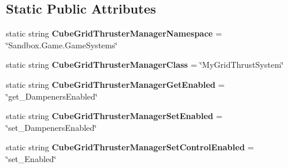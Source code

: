 \subsection*{Static Public Attributes}
\begin{DoxyCompactItemize}
\item 
\hypertarget{class_s_e_mod_a_p_i_internal_1_1_a_p_i_1_1_entity_1_1_sector_1_1_sector_object_1_1_cube_grid_thruster_manager_acc9e664b083af30d3189ae2f69c47e2f}{}static string {\bfseries Cube\+Grid\+Thruster\+Manager\+Namespace} = \char`\"{}Sandbox.\+Game.\+Game\+Systems\char`\"{}\label{class_s_e_mod_a_p_i_internal_1_1_a_p_i_1_1_entity_1_1_sector_1_1_sector_object_1_1_cube_grid_thruster_manager_acc9e664b083af30d3189ae2f69c47e2f}

\item 
\hypertarget{class_s_e_mod_a_p_i_internal_1_1_a_p_i_1_1_entity_1_1_sector_1_1_sector_object_1_1_cube_grid_thruster_manager_aabb329315ec131e37fdb0672e01287df}{}static string {\bfseries Cube\+Grid\+Thruster\+Manager\+Class} = \char`\"{}My\+Grid\+Thrust\+System\char`\"{}\label{class_s_e_mod_a_p_i_internal_1_1_a_p_i_1_1_entity_1_1_sector_1_1_sector_object_1_1_cube_grid_thruster_manager_aabb329315ec131e37fdb0672e01287df}

\item 
\hypertarget{class_s_e_mod_a_p_i_internal_1_1_a_p_i_1_1_entity_1_1_sector_1_1_sector_object_1_1_cube_grid_thruster_manager_ac6b44fe7955c6a6b18332a34139384ed}{}static string {\bfseries Cube\+Grid\+Thruster\+Manager\+Get\+Enabled} = \char`\"{}get\+\_\+\+Dampeners\+Enabled\char`\"{}\label{class_s_e_mod_a_p_i_internal_1_1_a_p_i_1_1_entity_1_1_sector_1_1_sector_object_1_1_cube_grid_thruster_manager_ac6b44fe7955c6a6b18332a34139384ed}

\item 
\hypertarget{class_s_e_mod_a_p_i_internal_1_1_a_p_i_1_1_entity_1_1_sector_1_1_sector_object_1_1_cube_grid_thruster_manager_a8e9408afea4fc11cb5d031cef5a038f7}{}static string {\bfseries Cube\+Grid\+Thruster\+Manager\+Set\+Enabled} = \char`\"{}set\+\_\+\+Dampeners\+Enabled\char`\"{}\label{class_s_e_mod_a_p_i_internal_1_1_a_p_i_1_1_entity_1_1_sector_1_1_sector_object_1_1_cube_grid_thruster_manager_a8e9408afea4fc11cb5d031cef5a038f7}

\item 
\hypertarget{class_s_e_mod_a_p_i_internal_1_1_a_p_i_1_1_entity_1_1_sector_1_1_sector_object_1_1_cube_grid_thruster_manager_a5e4b88678687dd77db5a07874df6d607}{}static string {\bfseries Cube\+Grid\+Thruster\+Manager\+Set\+Control\+Enabled} = \char`\"{}set\+\_\+\+Enabled\char`\"{}\label{class_s_e_mod_a_p_i_internal_1_1_a_p_i_1_1_entity_1_1_sector_1_1_sector_object_1_1_cube_grid_thruster_manager_a5e4b88678687dd77db5a07874df6d607}

\end{DoxyCompactItemize}
